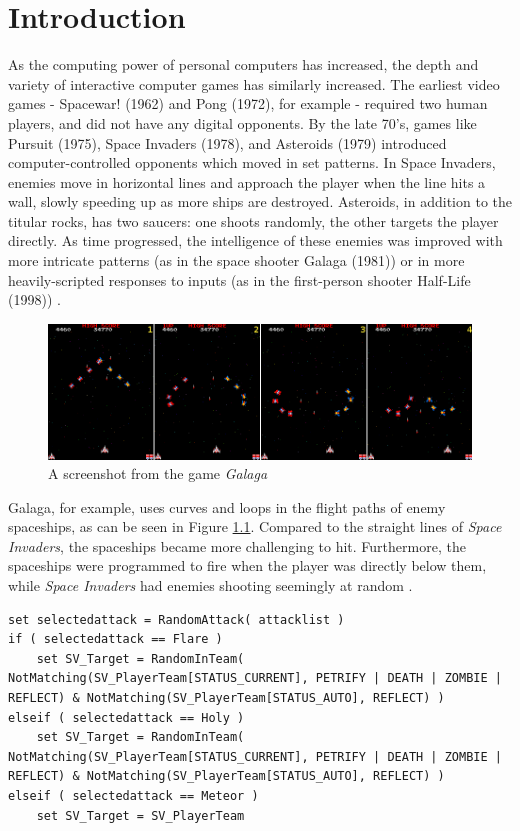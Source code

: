 \chapter{Introduction}
As the computing power of personal computers has increased, the depth and variety of interactive computer games has similarly increased. The earliest video games - Spacewar! (1962) and Pong (1972), for example - required two human players, and did not have any digital opponents. By the late 70's, games like Pursuit (1975), Space Invaders (1978), and Asteroids (1979) introduced computer-controlled opponents which moved in set patterns. In Space Invaders, enemies move in horizontal lines and approach the player when the line hits a wall, slowly speeding up as more ships are destroyed. Asteroids, in addition to the titular rocks, has two saucers: one shoots randomly, the other targets the player directly. As time progressed, the intelligence of these enemies was improved with more intricate patterns (as in the space shooter Galaga (1981)) or in more heavily-scripted responses to inputs (as in the first-person shooter Half-Life (1998)) \cite{schw04}.

\begin{figure}[H]
  \centering
  \includegraphics{figures/ExampleGalaga.png}
  \caption{A screenshot from the game \textit{Galaga}}
  \label{fig:Galaga}
\end{figure}
Galaga, for example, uses curves and loops in the flight paths of enemy spaceships, as can be seen in Figure \ref{fig:Galaga}. Compared to the straight lines of \textit{Space Invaders}, the spaceships became more challenging to hit. Furthermore, the spaceships were programmed to fire when the player was directly below them, while \textit {Space Invaders} had enemies shooting seemingly at random \cite{schw04}.\\



\begin{lstlisting}
set selectedattack = RandomAttack( attacklist )
if ( selectedattack == Flare )
    set SV_Target = RandomInTeam( NotMatching(SV_PlayerTeam[STATUS_CURRENT], PETRIFY | DEATH | ZOMBIE | REFLECT) & NotMatching(SV_PlayerTeam[STATUS_AUTO], REFLECT) )
elseif ( selectedattack == Holy )
    set SV_Target = RandomInTeam( NotMatching(SV_PlayerTeam[STATUS_CURRENT], PETRIFY | DEATH | ZOMBIE | REFLECT) & NotMatching(SV_PlayerTeam[STATUS_AUTO], REFLECT) )
elseif ( selectedattack == Meteor )
    set SV_Target = SV_PlayerTeam
\end{lstlisting}

